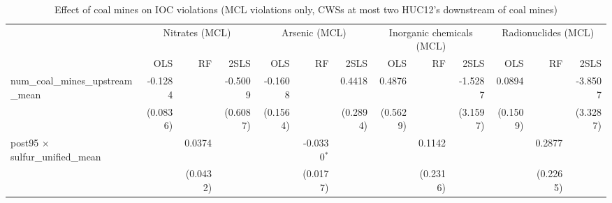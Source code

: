 
\begin{table}[htbp]
   
   \caption{\label{2sls_dwnstrm2step_minevio_mcl} Effect of coal mines on IOC violations (MCL violations only, CWSs at most two HUC12's downstream of coal mines)}
   \bigskip
   
   \centering
   
   \begin{adjustbox}{width = \textwidth, center}
      
      
      \begin{tabular}{lrrrrrrrrrrrr}
         \toprule
         
          & \multicolumn{3}{c}{Nitrates (MCL)} & \multicolumn{3}{c}{Arsenic (MCL)} & \multicolumn{3}{c}{Inorganic chemicals (MCL)} & \multicolumn{3}{c}{Radionuclides (MCL)}\\
         
                                                                             & OLS      & RF       & 2SLS     & OLS      & RF                    & 2SLS                  & OLS      & RF                    & 2SLS                  & OLS                   & RF       & 2SLS\\  
         
         \midrule 
         num\_coal\_mines\_upstream\_mean                                    & -0.1284  &          & -0.5009  & -0.1608  &                       & 0.4418                & 0.4876   &                       & -1.5287               & 0.0894                &          & -3.8507\\   
                                                                             & (0.0836) &          & (0.6087) & (0.1564) &                       & (0.2894)              & (0.5629) &                       & (3.1597)              & (0.1509)              &          & (3.3287)\\   
         post95 $\times$ sulfur\_unified\_mean                               &          & 0.0374   &          &          & -0.0330$^{*}$         &                       &          & 0.1142                &                       &                       & 0.2877   &   \\   
                                                                             &          & (0.0432) &          &          & (0.0177)              &                       &          & (0.2316)              &                       &                       & (0.2265) &   \\   
         

\end{tabular}
\end{adjustbox}
\end{table}
